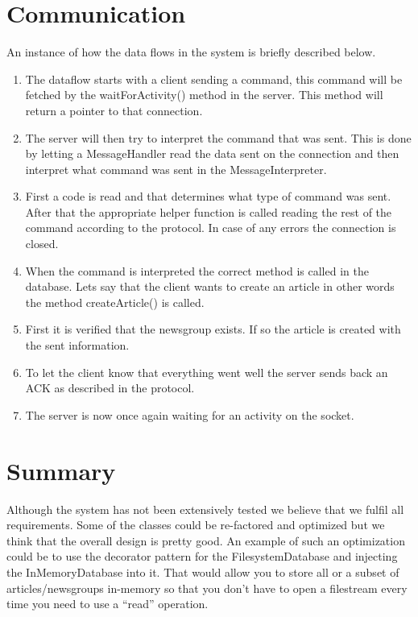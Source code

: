 \documentclass[a4paper, titlepage]{article}
\begin{document}
\section{Communication}\label{communication}
An instance of how the data flows in the system is briefly described below.

\begin{enumerate}
    \item The dataflow starts with a client sending a command, this command will be fetched by the waitForActivity() method in the server. This method will return a pointer to that connection.
	\item The server will then try to interpret the command that was sent. This is done by letting a MessageHandler read the data sent on the connection and then interpret what command was sent in the MessageInterpreter.
	\item First a code is read and that determines what type of command was sent. After that the appropriate helper function is called reading the rest of the command according to the protocol. In case of any errors the connection is closed.
	\item When the command is interpreted the correct method is called in the database. Lets say that the client wants to create an article in other words the method createArticle() is called.
	\item First it is verified that the newsgroup exists. If so the article is created with the sent information.
	\item To let the client know that everything went well the server sends back an ACK as described in the protocol.
	\item The server is now once again waiting for an activity on the socket.
\end{enumerate}

\section{Summary}\label{summary}
Although the system has not been extensively tested we believe that we fulfil all requirements. Some of the classes could be re-factored and optimized but we think that the overall design is pretty good. An example of such an optimization could be to use the decorator pattern for the FilesystemDatabase and injecting the InMemoryDatabase into it. That would allow you to store all or a subset of articles/newsgroups in-memory so that you don't have to open a filestream every time you need to use a ``read'' operation.
\end{document}
